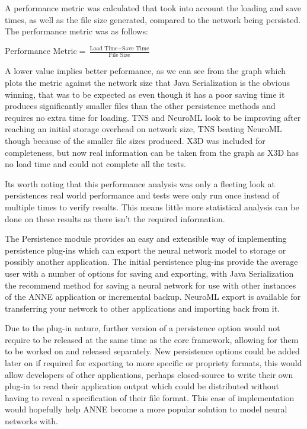 \documentclass[12pt,twoside]{article}
\begin{document}
{\mdseries\upshape
A performance metric was calculated that took into account the loading
and save times, as well as the file size generated, compared to the
network being persisted. The performance metric was as follows:}


\bigskip

{\mdseries\upshape
 $\text{Performance Metric}=\frac{\text{Load Time}+\text{Save
Time}}{\text{File Size}}$ }


\bigskip

{\mdseries\upshape
A lower value implies better peformance, as we can see from the graph
which plots the metric against the network size that Java Serialization
is the obvious winning, that was to be expected as even though it has a
poor saving time it produces significantly smaller files than the other
persistence methods and requires no extra time for loading. TNS and
NeuroML look to be improving after reaching an initial storage overhead
on network size, TNS beating NeuroML though because of the smaller file
sizes produced. X3D was included for completeness, but now real
information can be taken from the graph as X3D has no load time and
could not complete all the tests.}


\bigskip

{\mdseries\upshape
Its worth noting that this performance analysis was only a fleeting look
at persistences real world performance and tests were only run once
instead of multiple times to verify results. This means little more
statistical analysis can be done on these results as there
isn't the required information.}



\bigskip

{\mdseries\upshape
The Persistence module provides an easy and extensible way of
implementing persistence plug{}-ins which can export the neural network
model to storage or possibly another application. The initial
persistence plug{}-ins provide the average user with a number of
options for saving and exporting, with Java Serialization the recommend
method for saving a neural network for use with other instances of the
ANNE application or incremental backup. NeuroML export is available for
transferring your network to other applications and importing back from
it.}


\bigskip

{\mdseries\upshape
Due to the plug{}-in nature, further version of a persistence option
would not require to be released at the same time as the core
framework, allowing for them to be worked on and released separately.
New persistence options could be added later on if required for
exporting to more specific or propriety formats, this would allow
developers of other applications, perhaps closed{}-source to write
their own plug{}-in to read their application output which could be
distributed without having to reveal a specification of their file
format. This ease of implementation would hopefully help ANNE become a
more popular solution to model neural networks with.}
\end{document}
